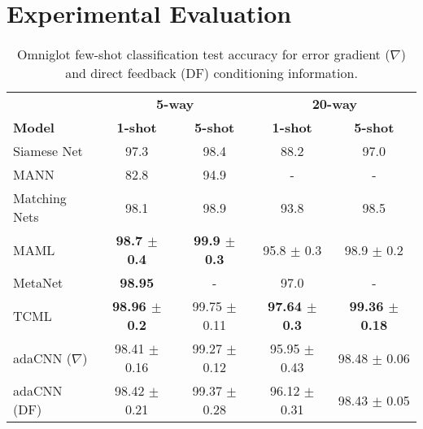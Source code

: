 \documentclass{article}
\begin{document}
\section{Experimental Evaluation}
\label{sec_results}
\begin{table*}[t] \caption{Omniglot few-shot classification test accuracy for error gradient ($\nabla$) and direct feedback (DF) conditioning information.}
  \label{tab:omni}
  \small
  \centering
  \begin{tabular}{lcccc}
    \toprule
    {} & \multicolumn{2}{c}{\bf 5-way} & \multicolumn{2}{c}{\bf 20-way}   \\
    \cmidrule(l{3pt}r{3pt}){2-3} \cmidrule(l{3pt}r{3pt}){4-5}
    \bf Model & \bf 1-shot & \bf 5-shot & \bf 1-shot & \bf 5-shot             \\
    \midrule
    Siamese Net \cite{koch2015siamese} & 97.3 & 98.4 & 88.2 & 97.0 \\
    MANN \cite{santoro2016meta} & 82.8 & 94.9 & - & - \\
    Matching Nets \cite{vinyals2016matching} & 98.1 & 98.9 & 93.8 & 98.5 \\
    MAML \cite{finn2017model} & \bf 98.7 $\pm$ 0.4 & \bf 99.9 $\pm$ 0.3 & 95.8 $\pm$ 0.3 & 98.9 $\pm$ 0.2 \\
    MetaNet \cite{pmlr-v70-munkhdalai17a} & \bf 98.95 & - & 97.0 & - \\
    TCML \cite{mishra2017meta} & \bf 98.96 $\pm$ 0.2 & 99.75 $\pm$ 0.11 & \bf 97.64 $\pm$ 0.3 & \bf 99.36 $\pm$ 0.18 \\
    \midrule
adaCNN ($\nabla$) & 98.41 $\pm$ 0.16 & 99.27 $\pm$ 0.12 & 95.95 $\pm$ 0.43 & 98.48 $\pm$ 0.06 \\
adaCNN (DF) & 98.42 $\pm$ 0.21 & 99.37 $\pm$ 0.28 & 96.12 $\pm$ 0.31 & 98.43 $\pm$ 0.05 \\
    \bottomrule
  \end{tabular}
\end{table*}
\end{document}
